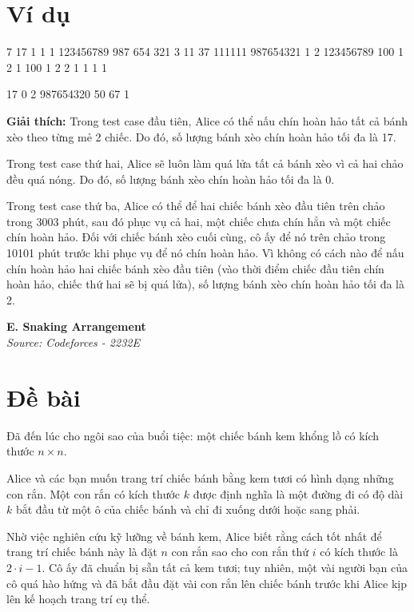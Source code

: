 \documentclass[11pt]{article}
\newcommand{\problem}[2]{
    \begin{problembox}
    \begin{center}
        \Large \textbf{#1} \\
        \vspace{0.2cm}
        \small \textit{Source: #2}
    \end{center}
    \end{problembox}
}
\newcommand{\explanation}[1]{
    \vspace{0.5cm}
    \noindent \textbf{Giải thích:} #1
}
\begin{document}
\section*{Ví dụ}
\begin{example}
\begin{inputbox}
7
17 1 1 1
123456789 987 654 321
3 11 37 111111
987654321 1 2 123456789
100 1 2 1
100 1 2 2
1 1 1 1
\end{inputbox}
\begin{outputbox}
17
0
2
987654320
50
67
1
\end{outputbox}
\end{example}

\explanation{
Trong test case đầu tiên, Alice có thể nấu chín hoàn hảo tất cả bánh xèo theo từng mẻ 2 chiếc. Do đó, số lượng bánh xèo chín hoàn hảo tối đa là 17.

Trong test case thứ hai, Alice sẽ luôn làm quá lửa tất cả bánh xèo vì cả hai chảo đều quá nóng. Do đó, số lượng bánh xèo chín hoàn hảo tối đa là 0.

Trong test case thứ ba, Alice có thể để hai chiếc bánh xèo đầu tiên trên chảo trong 3003 phút, sau đó phục vụ cả hai, một chiếc chưa chín hẳn và một chiếc chín hoàn hảo. Đối với chiếc bánh xèo cuối cùng, cô ấy để nó trên chảo trong 10101 phút trước khi phục vụ để nó chín hoàn hảo. Vì không có cách nào để nấu chín hoàn hảo hai chiếc bánh xèo đầu tiên (vào thời điểm chiếc đầu tiên chín hoàn hảo, chiếc thứ hai sẽ bị quá lửa), số lượng bánh xèo chín hoàn hảo tối đa là 2.
}

\newpage
\problem{E. Snaking Arrangement}{Codeforces - 2232E}

\section*{Đề bài}
Đã đến lúc cho ngôi sao của buổi tiệc: một chiếc bánh kem khổng lồ có kích thước $n \times n$.

Alice và các bạn muốn trang trí chiếc bánh bằng kem tươi có hình dạng những con rắn. Một con rắn có kích thước $k$ được định nghĩa là một đường đi có độ dài $k$ bắt đầu từ một ô của chiếc bánh và chỉ đi xuống dưới hoặc sang phải.

Nhờ việc nghiên cứu kỹ lưỡng về bánh kem, Alice biết rằng cách tốt nhất để trang trí chiếc bánh này là đặt $n$ con rắn sao cho con rắn thứ $i$ có kích thước là $2 \cdot i - 1$. Cô ấy đã chuẩn bị sẵn tất cả kem tươi; tuy nhiên, một vài người bạn của cô quá hào hứng và đã bắt đầu đặt vài con rắn lên chiếc bánh trước khi Alice kịp lên kế hoạch trang trí cụ thể.
\end{document}
